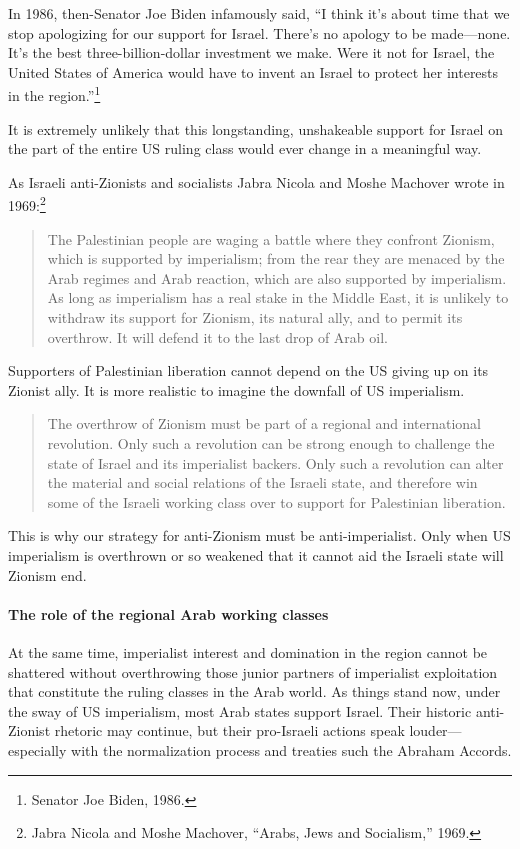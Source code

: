 In 1986, then-Senator Joe Biden infamously said, ``I think it's about time that we stop apologizing for our support for Israel. There's no apology to be made---none. It's the best three-billion-dollar investment we make. Were it not for Israel, the United States of America would have to invent an Israel to protect her interests in the region.''\footnote{Senator Joe Biden, 1986.}

It is extremely unlikely that this longstanding, unshakeable support for Israel on the part of the entire US ruling class would ever change in a meaningful way.

As Israeli anti-Zionists and socialists Jabra Nicola and Moshe Machover wrote in 1969:\footnote{Jabra Nicola and Moshe Machover, ``Arabs, Jews and Socialism,'' 1969.}

\blockquote{The Palestinian people are waging a battle where they confront Zionism, which is supported by imperialism; from the rear they are menaced by the Arab regimes and Arab reaction, which are also supported by imperialism. As long as imperialism has a real stake in the Middle East, it is unlikely to withdraw its support for Zionism, its natural ally, and to permit its overthrow. It will defend it to the last drop of Arab oil.}

Supporters of Palestinian liberation cannot depend on the US giving up on its Zionist ally. It is more realistic to imagine the downfall of US imperialism.

\blockquote{The overthrow of Zionism must be part of a regional and international revolution. Only such a revolution can be strong enough to challenge the state of Israel and its imperialist backers. Only such a revolution can alter the material and social relations of the Israeli state, and therefore win some of the Israeli working class over to support for Palestinian liberation.}

This is why our strategy for anti-Zionism must be anti-imperialist. Only when US imperialism is overthrown or so weakened that it cannot aid the Israeli state will Zionism end.

\paragraph{The role of the regional Arab working classes}

At the same time, imperialist interest and domination in the region cannot be shattered without overthrowing those junior partners of imperialist exploitation that constitute the ruling classes in the Arab world. As things stand now, under the sway of US imperialism, most Arab states support Israel. Their historic anti-Zionist rhetoric may continue, but their pro-Israeli actions speak louder---especially with the normalization process and treaties such the Abraham Accords.

